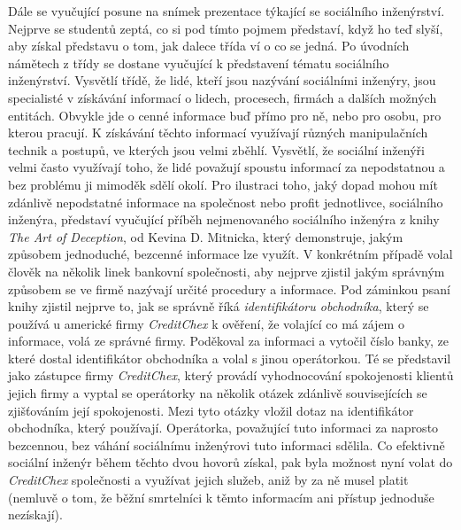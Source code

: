 \documentclass[a4paper, 12pt]{article}
\begin{document}
Dále se vyučující posune na snímek prezentace týkající se sociálního inženýrství. Nejprve se studentů zeptá, co si pod tímto pojmem představí, když ho teď slyší, aby získal představu o tom, jak dalece třída ví o co se jedná. Po úvodních námětech z třídy se dostane vyučující k představení tématu sociálního inženýrství. Vysvětlí třídě, že lidé, kteří jsou nazývání sociálními inženýry, jsou specialisté v získávání informací o lidech, procesech, firmách a dalších možných entitách. Obvykle jde o cenné informace buď přímo pro ně, nebo pro osobu, pro kterou pracují. K získávání těchto informací využívají různých manipulačních technik a postupů, ve kterých jsou velmi zběhlí. Vysvětlí, že sociální inženýři velmi často využívají toho, že lidé považují spoustu informací za nepodstatnou a bez problému ji mimoděk sdělí okolí. Pro ilustraci toho, jaký dopad mohou mít zdánlivě nepodstatné informace na společnost nebo profit jednotlivce, sociálního inženýra, představí vyučující příběh nejmenovaného sociálního inženýra z knihy \textit{The Art of Deception}, od Kevina D. Mitnicka, který demonstruje, jakým způsobem jednoduché, bezcenné informace lze využít. V konkrétním případě volal člověk na několik linek bankovní společnosti, aby nejprve zjistil jakým správným způsobem se ve firmě nazývají určité procedury a informace. Pod záminkou psaní knihy zjistil nejprve to, jak se správně říká \textit{identifikátoru obchodníka}, který se používá u americké firmy \textit{CreditChex} k ověření, že volající co má zájem o informace, volá ze správné firmy. Poděkoval za informaci a vytočil číslo banky, ze které dostal identifikátor obchodníka a volal s jinou operátorkou. Té se představil jako zástupce firmy \textit{CreditChex}, který provádí vyhodnocování spokojenosti klientů jejich firmy a vyptal se operátorky na několik otázek zdánlivě souvisejících se zjišťováním její spokojenosti. Mezi tyto otázky vložil dotaz na identifikátor obchodníka, který používají. Operátorka, považující tuto informaci za naprosto bezcennou, bez váhání sociálnímu inženýrovi tuto informaci sdělila. Co efektivně sociální inženýr během těchto dvou hovorů získal, pak byla možnost nyní volat do \textit{CreditChex} společnosti a využívat jejich služeb, aniž by za ně musel platit (nemluvě o tom, že běžní smrtelníci k těmto informacím ani přístup jednoduše nezískají).
\end{document}
